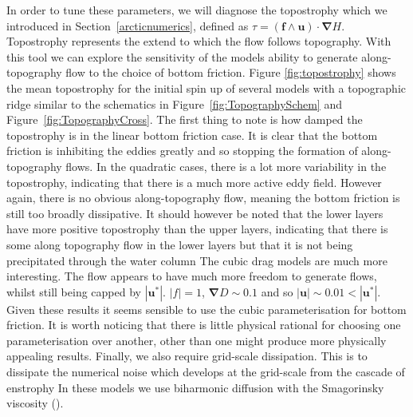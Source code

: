 \documentclass[12pt,a4paper]{report}
\newcommand*\figref[1]{Figure~\ref{#1}}
\newcommand*\secref[1]{Section~\ref{#1}}
\begin{document}
  In order to tune these parameters, we will diagnose the
  topostrophy which we introduced in \secref{arcticnumerics},
  defined as
  $\tau = \left(\boldsymbol{ f } \wedge
  \boldsymbol{ u } \right) \cdot \boldsymbol{\nabla} H $. 
  Topostrophy represents the extend to which the flow
  follows topography. With this tool we can explore the sensitivity of the models
  ability to generate along-topography flow to the choice of bottom friction. 
  Figure \ref{fig:topostrophy} shows the mean topostrophy for the
  initial spin up of several models with a topographic ridge similar to
  the schematics in \figref{fig:TopographySchem} and
	\figref{fig:TopographyCross}. The first thing to note is how damped the 
  topostrophy is in the linear
  bottom friction case. It is clear that the bottom friction is inhibiting the 
  eddies greatly and so stopping the formation of along-topography flows. In
  the quadratic cases, there is a lot more variability in the topostrophy, indicating
  that there is a much more active eddy field. However again, there is no obvious
  along-topography flow, meaning the bottom friction is still too broadly dissipative.
  It should however be noted that the lower layers have more positive topostrophy than
  the upper layers, indicating that there is some along topography flow in the lower 
  layers but that it is not being precipitated  through the water column
  The cubic drag models are much more interesting. The flow appears to have much more
  freedom to generate flows, whilst still being capped by $\left|\boldsymbol{u}^{\ast}\right|$. $\left|f\right| = 1$, $\boldsymbol{\nabla} D \sim 0.1$ and so $\left|\boldsymbol{u}\right| \sim 0.01 < \left|\boldsymbol{u}^{\ast}\right|$.
  Given these results it seems sensible to use the cubic parameterisation for bottom 
  friction. It is worth noticing that there is little physical rational for choosing
  one parameterisation over another, other than one might produce more physically 
  appealing results. Finally, we also require grid-scale dissipation. This is to dissipate the
  numerical noise which develops at the grid-scale from the cascade of enstrophy
  In these models we use biharmonic diffusion with the Smagorinsky viscosity (\cite{smagorinsky1963general}). 
  
\end{document}
